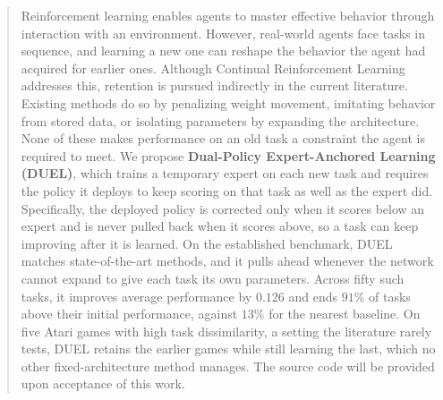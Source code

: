 \begin{abstract}
Reinforcement learning enables agents to master effective behavior through
interaction with an environment. However, real-world agents face tasks in
sequence, and learning a new one can reshape the behavior the agent had acquired
for earlier ones. Although Continual Reinforcement Learning addresses this,
retention is pursued indirectly in the current literature. Existing methods do
so by penalizing weight movement, imitating behavior from stored data, or
isolating parameters by expanding the architecture. None of these makes performance on an old task a
constraint the agent is required to meet. We propose \textbf{Dual-Policy
Expert-Anchored Learning (DUEL)}, which trains a temporary expert on each new
task and requires the policy it deploys to keep scoring on that task as well as
the expert did. Specifically, the deployed policy is corrected only when it
scores below an expert and is never pulled back when it scores above, so a task
can keep improving after it is learned. On the established benchmark, DUEL
matches state-of-the-art methods, and it pulls ahead whenever the network cannot
expand to give each task its own parameters. Across fifty such tasks, it
improves average performance by $0.126$ and ends $91\%$ of tasks above their
initial performance, against $13\%$ for the nearest baseline. On five Atari
games with high task dissimilarity, a setting the literature rarely tests, DUEL
retains the earlier games while still learning the last, which no other
fixed-architecture method manages. The source code will be provided upon
acceptance of this work.
\end{abstract}
